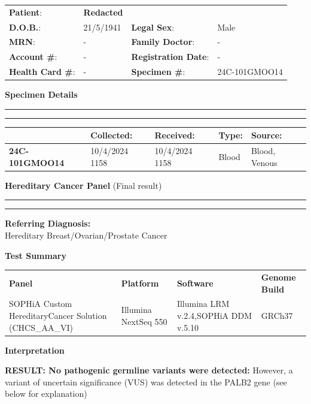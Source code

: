 \documentclass[10pt,letterpaper]{extarticle}
\newcommand{\doublerule}{\rule{\textwidth}{1pt}

\vspace{-2em}%
\rule{\textwidth}{1pt}}
\begin{document}
\colorbox[gray]{0.8}{\parbox{\textwidth}{
  \begin{tabular}{p{} p{} p{} p{}}
    {\bf Patient}: & {\Large \bf Redacted} & & \\
    {\bf D.O.B.}: & 21/5/1941 & {\bf Legal Sex}: & Male \\
    {\bf MRN}: & - & {\bf Family Doctor}: & -\\
    {\bf Account \#}: & - & {\bf Registration Date}: & -\\
    {\bf Health Card \#}: & - & {\bf Specimen \#}: & 24C-101GMOO14\\
  \end{tabular}
}}

{\bf Specimen Details}\\
\doublerule

\vspace{-1em}
\begin{tabular}{ p{3.2cm} p{3.2cm} p{3.2cm} p{3.2cm} p{3.2cm} }
              & \bf Collected: & \bf Received: & \bf Type: & \bf Source: \\ \hline
\bf 24C-101GMOO14 &  10/4/2024 1158 & 10/4/2024 1158 & Blood & Blood, Venous \\
\end{tabular}


{\bf Hereditary Cancer Panel} (Final result) \\
\doublerule

{\bf \large Referring Diagnosis:}\\
Hereditary Breast/Ovarian/Prostate Cancer

{\bf \large Test Summary}

\begin{tabular}{ p{} p{} p{} p{} }
\bf Panel & \bf Platform & \bf Software & \bf Genome Build \\
SOPHiA Custom Hereditary\newline Cancer Solution (CHCS\_AA\_VI) & Illumina NextSeq 550 & Illumina LRM v.2.4,\newline SOPHiA DDM v.5.10 & GRCh37\\
\end{tabular}


{\bf \large Interpretation}

{\bf RESULT: No pathogenic germline variants were detected:} However, a variant of uncertain significance (VUS) was detected in the PALB2 gene (see below for explanation)
\end{document}
